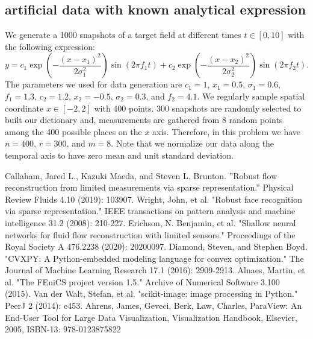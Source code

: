 \documentclass[conference]{IEEEtran}
\begin{document}
\subsection{artificial data with known analytical expression}
We generate a 1000 snapshots of a target field at different times $t \in [0, 10]$ with the following expression:
\begin{equation}
y = c_1 \exp(-\frac{(x-x_1)^2}{2\sigma_1^2}) \sin(2\pi f_1 t)+
    c_2 \exp(-\frac{(x-x_2)^2}{2\sigma_2^2}) \sin(2\pi f_2 t).
\end{equation}
The parameters we used for data generation are $c_1=1$, $x_1=0.5$, $\sigma_1=0.6$, $f_1=1.3$, $c_2=1.2$, $x_2=-0.5$, $\sigma_2=0.3$, and $f_2=4.1$. We regularly sample spatial coordinate $x \in [-2, 2]$ with 400 points. 300 snapshots are randomly selected to built our dictionary and, measurements are gathered from 8 random points among the 400 possible places on the $x$ axis. Therefore, in this problem we have $n=400$, $r=300$, and $m=8$. Note that we normalize our data along the temporal axis to have zero mean and unit standard deviation.




\begin{thebibliography}{00}
 Callaham, Jared L., Kazuki Maeda, and Steven L. Brunton. ''Robust flow reconstruction from limited measurements via sparse representation.'' Physical Review Fluids 4.10 (2019): 103907.
%
 Wright, John, et al. "Robust face recognition via sparse representation." IEEE transactions on pattern analysis and machine intelligence 31.2 (2008): 210-227.
%
 Erichson, N. Benjamin, et al. "Shallow neural networks for fluid flow reconstruction with limited sensors." Proceedings of the Royal Society A 476.2238 (2020): 20200097.
%
 Diamond, Steven, and Stephen Boyd. "CVXPY: A Python-embedded modeling language for convex optimization." The Journal of Machine Learning Research 17.1 (2016): 2909-2913.
%
 Alnaes, Martin, et al. "The FEniCS project version 1.5." Archive of Numerical Software 3.100 (2015).
%
 Van der Walt, Stefan, et al. "scikit-image: image processing in Python." PeerJ 2 (2014): e453.
%
 Ahrens, James, Geveci, Berk, Law, Charles, ParaView: An End-User Tool for Large Data Visualization, Visualization Handbook, Elsevier, 2005, ISBN-13: 978-0123875822
%
\end{thebibliography}

\vspace{12pt}
\end{document}
